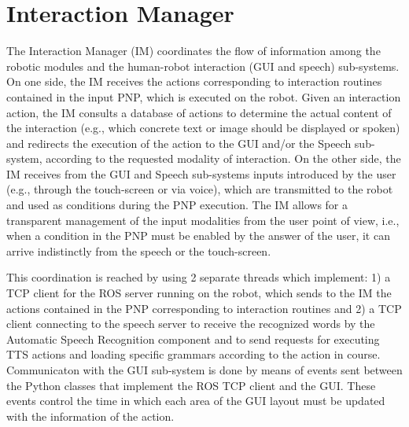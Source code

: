 \documentclass[11pt,a4paper]{article}
\begin{document}
\section{Interaction Manager}
\label{sec:IM}
The Interaction Manager (IM) coordinates the flow of information among the robotic modules and the human-robot interaction (GUI and speech) sub-systems. On one side, the IM receives the actions corresponding to interaction routines contained in the input PNP, which is executed on the robot. Given an interaction action, the IM consults a database of actions to determine the actual content of the interaction (e.g., which concrete text or image should be displayed or spoken) and redirects the execution of the action to the GUI and/or the Speech sub-system, according to the requested modality of interaction. On the other side, the IM receives from the GUI and Speech sub-systems inputs introduced by the user (e.g., through the touch-screen or via voice), which are transmitted to the robot and used as conditions during the PNP execution. The IM allows for a transparent management of the input modalities from the user point of view, i.e., when a condition in the PNP must be enabled by the answer of the user, it can arrive indistinctly from the speech or the touch-screen.

This coordination is reached by using 2 separate threads which implement: 1) a TCP client for the ROS server running on the robot, which sends to the IM the actions contained in the PNP corresponding to interaction routines and 2) a TCP client connecting to the speech server to receive the recognized words by the Automatic Speech Recognition component and to send requests for executing TTS actions and loading specific grammars according to the action in course. Communicaton with the GUI sub-system is done by means of events sent between the Python classes that implement the ROS TCP client and the GUI. These events control the time in which each area of the GUI layout must be updated with the information of the action.
\end{document}
